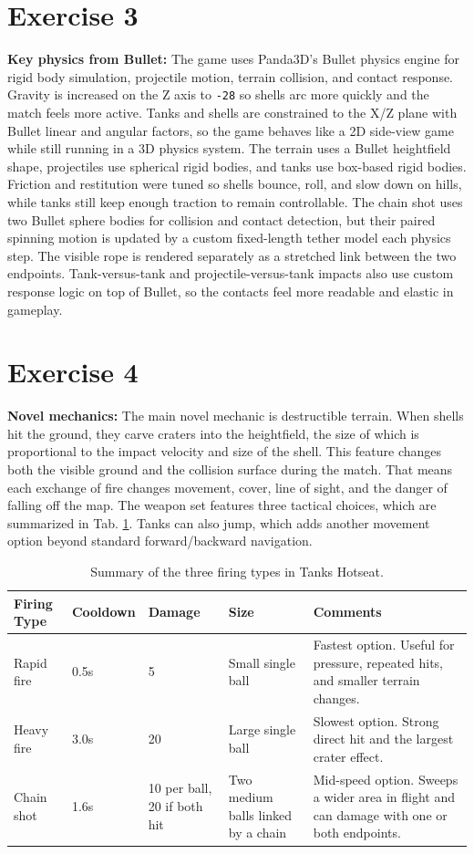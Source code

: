 \documentclass[12pt]{article}
\begin{document}
\section*{Exercise 3}
\textbf{Key physics from Bullet:} The game uses Panda3D's Bullet physics engine for rigid body simulation, projectile motion, terrain collision, and contact response. Gravity is increased on the Z axis to \texttt{-28} so shells arc more quickly and the match feels more active. Tanks and shells are constrained to the X/Z plane with Bullet linear and angular factors, so the game behaves like a 2D side-view game while still running in a 3D physics system. The terrain uses a Bullet heightfield shape, projectiles use spherical rigid bodies, and tanks use box-based rigid bodies. Friction and restitution were tuned so shells bounce, roll, and slow down on hills, while tanks still keep enough traction to remain controllable. The chain shot uses two Bullet sphere bodies for collision and contact detection, but their paired spinning motion is updated by a custom fixed-length tether model each physics step. The visible rope is rendered separately as a stretched link between the two endpoints. Tank-versus-tank and projectile-versus-tank impacts also use custom response logic on top of Bullet, so the contacts feel more readable and elastic in gameplay.

\section*{Exercise 4}
\textbf{Novel mechanics:} The main novel mechanic is destructible terrain. When shells hit the ground, they carve craters into the heightfield, the size of which is proportional to the impact velocity and size of the shell. This feature changes both the visible ground and the collision surface during the match. That means each exchange of fire changes movement, cover, line of sight, and the danger of falling off the map. The weapon set features three tactical choices, which are summarized in Tab. \ref{tab:fire}. Tanks can also jump, which adds another movement option beyond standard forward/backward navigation.

\begin{table}[ht]
\centering
\small
\renewcommand{\arraystretch}{1.2}
\begin{tabular}{|p{1.3in}|p{0.85in}|p{1.15in}|p{0.8in}|p{1.8in}|}
\hline
\textbf{Firing Type} & \textbf{Cooldown} & \textbf{Damage} & \textbf{Size} & \textbf{Comments} \\
\hline
Rapid fire & 0.5s & 5 & Small single ball & Fastest option. Useful for pressure, repeated hits, and smaller terrain changes. \\
\hline
Heavy fire & 3.0s & 20 & Large single ball & Slowest option. Strong direct hit and the largest crater effect. \\
\hline
Chain shot & 1.6s & 10 per ball, 20 if both hit & Two medium balls linked by a chain & Mid-speed option. Sweeps a wider area in flight and can damage with one or both endpoints. \\
\hline
\end{tabular}
\caption{Summary of the three firing types in Tanks Hotseat.}
\label{tab:fire}
\end{table}
\end{document}
